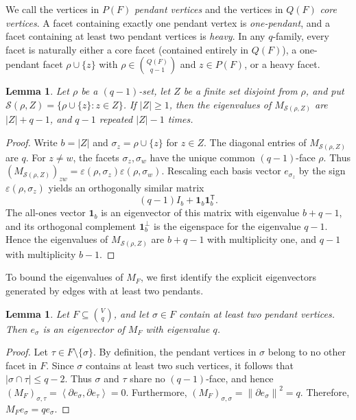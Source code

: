 \documentclass[11pt]{article}
\newtheorem{lemma}[theorem]{Lemma}
\newcommand{\bd}{\partial}
\newcommand{\ip}[2]{\left\langle #1,#2\right\rangle}
\newcommand{\norm}[1]{\left\lVert #1\right\rVert}
\newcommand{\one}{\mathbf 1}
\begin{document}
	We call the vertices in \(P(F)\) \emph{pendant vertices} and the vertices in
	\(Q(F)\) \emph{core vertices}. A facet containing exactly one pendant
	vertex is \emph{one-pendant}, and a facet containing at least two pendant
	vertices is \emph{heavy}.
	In any \(q\)-family, every facet is naturally either a core facet (contained entirely in \(Q(F)\)), a one-pendant facet \(\rho\cup\{z\}\) with \(\rho\in\binom{Q(F)}{q-1}\) and \(z\in P(F)\), or a heavy facet.
	
	\begin{lemma}\label{lem:star}
		Let \(\rho\) be a \((q-1)\)-set, let \(Z\) be a finite set disjoint
		from \(\rho\), and put
		\(\mathcal S(\rho,Z)=\{\rho\cup\{z\}:z\in Z\}\).
		If \(|Z|\ge1\), then the eigenvalues of
		\(M_{\mathcal S(\rho,Z)}\) are \(|Z|+q-1\), and \(q-1\) repeated
		\(|Z|-1\) times.
	\end{lemma}
	
	\begin{proof}
		Write \(b=|Z|\) and \(\sigma_z=\rho\cup\{z\}\) for \(z\in Z\). The
		diagonal entries of \(M_{\mathcal S(\rho,Z)}\) are \(q\). For
		\(z\ne w\), the facets \(\sigma_z,\sigma_w\) have the unique common
		\((q-1)\)-face \(\rho\).
		Thus
		\((M_{\mathcal S(\rho,Z)})_{zw}
		=\varepsilon(\rho,\sigma_z)\varepsilon(\rho,\sigma_w)\).
		Rescaling each basis vector \(e_{\sigma_z}\) by the sign
		\(\varepsilon(\rho,\sigma_z)\) yields an orthogonally similar matrix
		\[
		(q-1)I_b+\one_b\one_b^{\mathsf T}.
		\]
		The all-ones vector \(\one_b\) is an eigenvector of this matrix with eigenvalue
		\(b+q-1\), and its orthogonal complement \(\one_b^\perp\) is the eigenspace
		for the eigenvalue \(q-1\). Hence the eigenvalues of
		\(M_{\mathcal S(\rho,Z)}\) are \(b+q-1\) with multiplicity one, and \(q-1\) with
		multiplicity \(b-1\).
	\end{proof}
To bound the eigenvalues of $M_F$, we first identify the explicit eigenvectors generated by edges with at least two pendants.
\begin{lemma}\label{lem:heavy-isolated}
	Let \(F\subseteq\binom Vq\), and let \(\sigma\in F\) contain at least two pendant vertices. Then \(e_\sigma\) is an eigenvector of \(M_F\) with eigenvalue \(q\).
\end{lemma}

\begin{proof}
	Let \(\tau\in F\setminus\{\sigma\}\). By definition, the pendant vertices in \(\sigma\) belong to no other facet in \(F\). Since \(\sigma\) contains at least two such vertices, it follows that \(|\sigma\cap\tau|\le q-2\). Thus \(\sigma\) and \(\tau\) share no \((q-1)\)-face, and hence \((M_F)_{\sigma,\tau}=\ip{\bd e_\sigma}{\bd e_\tau}=0\). Furthermore, \((M_F)_{\sigma,\sigma}=\norm{\bd e_\sigma}^2=q\). Therefore, \(M_Fe_\sigma=qe_\sigma\).
\end{proof}
	
\end{document}
